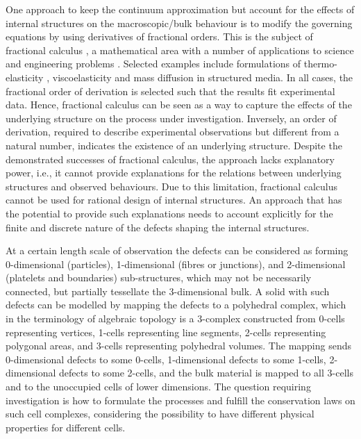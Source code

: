 \documentclass{elsarticle}
\theoremstyle{definition}
\begin{document}
One approach to keep the continuum approximation but account for the effects of internal structures on the macroscopic/bulk behaviour is to modify the governing equations by using derivatives of fractional orders. This is the subject of fractional calculus \cite{West2017_Fractional}, a mathematical area with a number of applications to science and engineering problems \cite{Sun2018_Fractional}. Selected examples include formulations of thermo-elasticity \cite{Sherief2010_Fractional}, viscoelasticity \cite{DiPaola2011_Fractional} and mass diffusion \cite{Bologna2015_Fractional} in structured media. In all cases, the fractional order of derivation is selected such that the results fit experimental data. Hence, fractional calculus can be seen as a way to capture the effects of the underlying structure on the process under investigation. Inversely, an order of derivation, required to describe experimental observations but different from a natural number, indicates the existence of an underlying structure. Despite the demonstrated successes of fractional calculus, the approach lacks explanatory power, i.e., it cannot provide explanations for the relations between underlying structures and observed behaviours. Due to this limitation, fractional calculus cannot be used for rational design of internal structures. An approach that has the potential to provide such explanations needs to account explicitly for the finite and discrete nature of the defects shaping the internal structures.

At a certain length scale of observation the defects can be considered as forming 0-dimensional (particles), 1-dimensional (fibres or junctions), and 2-dimensional (platelets and boundaries) sub-structures, which may not be necessarily connected, but partially tessellate the 3-dimensional bulk. A solid with such defects can be modelled by mapping the defects to a polyhedral complex, which in the terminology of algebraic topology is a 3-complex constructed from 0-cells representing vertices, 1-cells representing line segments, 2-cells representing polygonal areas, and 3-cells representing polyhedral volumes. The mapping sends 0-dimensional defects to some 0-cells, 1-dimensional defects to some 1-cells, 2-dimensional defects to some 2-cells, and the bulk material is mapped to all 3-cells and to the unoccupied cells of lower dimensions. The question requiring investigation is how to formulate the processes and fulfill the conservation laws on such cell complexes, considering the possibility to have different physical properties for different cells. 
\end{document}
